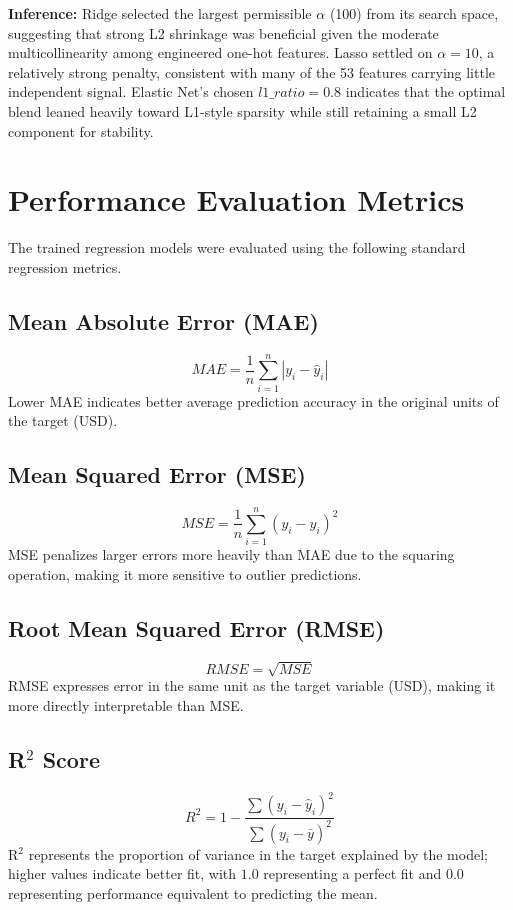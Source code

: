 \documentclass[12pt,a4paper]{article}
\begin{document}
\textbf{Inference:} Ridge selected the largest permissible $\alpha$ (100) from its search space, suggesting that strong L2 shrinkage was beneficial given the moderate multicollinearity among engineered one-hot features. Lasso settled on $\alpha = 10$, a relatively strong penalty, consistent with many of the 53 features carrying little independent signal. Elastic Net's chosen $l1\_ratio = 0.8$ indicates that the optimal blend leaned heavily toward L1-style sparsity while still retaining a small L2 component for stability.

\section{Performance Evaluation Metrics}

The trained regression models were evaluated using the following standard regression metrics.

\subsection*{Mean Absolute Error (MAE)}
\[
MAE = \frac{1}{n}\sum_{i=1}^{n}|y_i - \hat{y}_i|
\]
Lower MAE indicates better average prediction accuracy in the original units of the target (USD).

\subsection*{Mean Squared Error (MSE)}
\[
MSE = \frac{1}{n}\sum_{i=1}^{n}(y_i - \hat{y}_i)^2
\]
MSE penalizes larger errors more heavily than MAE due to the squaring operation, making it more sensitive to outlier predictions.

\subsection*{Root Mean Squared Error (RMSE)}
\[
RMSE = \sqrt{MSE}
\]
RMSE expresses error in the same unit as the target variable (USD), making it more directly interpretable than MSE.

\subsection*{R$^2$ Score}
\[
R^2 = 1 - \frac{\sum(y_i-\hat{y}_i)^2}{\sum(y_i-\bar{y})^2}
\]
R$^2$ represents the proportion of variance in the target explained by the model; higher values indicate better fit, with $1.0$ representing a perfect fit and $0.0$ representing performance equivalent to predicting the mean.
\end{document}
